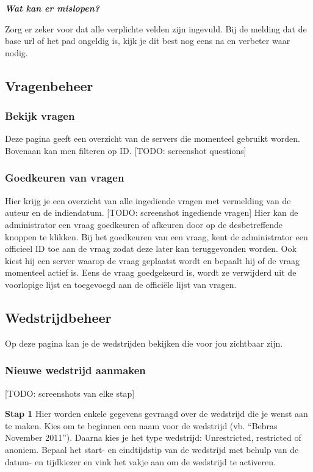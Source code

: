 \documentclass[]{article}
\begin{document}
\textbf{\textit{Wat kan er mislopen?}}

Zorg er zeker voor dat alle verplichte velden zijn ingevuld. Bij de melding dat de base url of het pad ongeldig is, kijk je dit best nog eens na en verbeter waar nodig.

\subsection{Vragenbeheer}

\subsubsection{Bekijk vragen}
Deze pagina geeft een overzicht van de servers die momenteel gebruikt worden. Bovenaan kan men filteren op ID. [TODO: screenshot questions]

\subsubsection{Goedkeuren van vragen}
Hier krijg je een overzicht van alle ingediende vragen met vermelding van de auteur en de indiendatum. [TODO: screenshot ingediende vragen] Hier kan de administrator een vraag goedkeuren of afkeuren door op de desbetreffende knoppen te klikken. Bij het goedkeuren van een vraag, kent de administrator een officieel ID toe aan de vraag zodat deze later kan teruggevonden worden. Ook kiest hij een server waarop de vraag geplaatst wordt en bepaalt hij of de vraag momenteel actief is. Eens de vraag goedgekeurd is, wordt ze verwijderd uit de voorlopige lijst en toegevoegd aan de officiële lijst van vragen.

\subsection{Wedstrijdbeheer}
Op deze pagina kan je de wedstrijden bekijken die voor jou zichtbaar zijn. 

\subsubsection{Nieuwe wedstrijd aanmaken}

[TODO: screenshots van elke stap]

\textbf{Stap 1}
Hier worden enkele gegevens gevraagd over de wedstrijd die je wenst aan te maken. 
Kies om te beginnen een naam voor de wedstrijd (vb. "`Bebras November 2011"'). Daarna kies je het type wedstrijd: Unrestricted, restricted of anoniem. Bepaal het start- en eindtijdstip van de wedstrijd met behulp van de datum- en tijdkiezer en vink het vakje aan om de wedstrijd te activeren.
\end{document}
